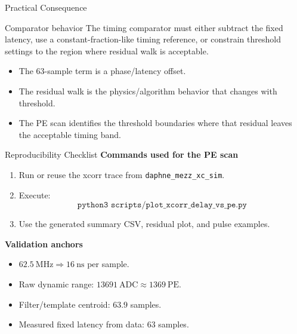 \documentclass[aspectratio=169]{beamer}
\newcommand{\repo}{\texttt{daphne\_mezz\_xc\_sim}}
\newcommand{\sampleperiod}{\SI{16}{\nano\second}}
\newcommand{\clockfreq}{\SI{62.5}{\mega\hertz}}
\newcommand{\rawspan}{\num{13691}}
\newcommand{\rawrangepe}{\num{1369}}
\begin{document}
\begin{frame}{Practical Consequence}
\small
\begin{alertblock}{Comparator behavior}
The timing comparator must either subtract the fixed latency, use a constant-fraction-like timing reference, or constrain threshold settings to the region where residual walk is acceptable.
\end{alertblock}

\vspace{0.5em}
\begin{itemize}
  \item The 63-sample term is a phase/latency offset.
  \item The residual walk is the physics/algorithm behavior that changes with threshold.
  \item The PE scan identifies the threshold boundaries where that residual leaves the acceptable timing band.
\end{itemize}
\end{frame}

\begin{frame}{Reproducibility Checklist}
\scriptsize
\textbf{Commands used for the PE scan}
\begin{enumerate}
  \item Run or reuse the xcorr trace from \repo.
  \item Execute:
  \[
  \texttt{python3 scripts/plot\_xcorr\_delay\_vs\_pe.py}
  \]
  \item Use the generated summary CSV, residual plot, and pulse examples.
\end{enumerate}

\vspace{0.25em}
\textbf{Validation anchors}
\begin{itemize}
  \item \(\clockfreq \Rightarrow \sampleperiod\) per sample.
  \item Raw dynamic range: \(\rawspan~\mathrm{ADC}\approx\rawrangepe~\mathrm{PE}\).
  \item Filter/template centroid: \(63.9\) samples.
  \item Measured fixed latency from data: \(63\) samples.
\end{itemize}
\end{frame}
\end{document}
